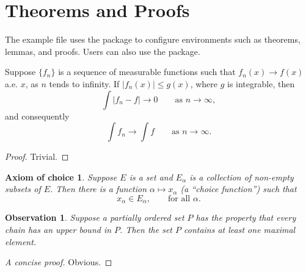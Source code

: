 \section{Theorems and Proofs}

The example file uses the  package to configure environments such as theorems, lemmas, and proofs.
Users can also use the  package.

\begin{theorem}
  Suppose $\{f_n\}$ is a sequence of measurable functions such that
  $f_n(x) \to f(x)$ a.e. $x$, as $n$ tends to infinity.
  If $|f_n(x)| \le g(x)$, where $g$ is integrable, then
  \begin{equation}
    \int |f_n - f| \to 0 \qquad \text{as } n \to \infty,
  \end{equation}
  and consequently
  \begin{equation}
    \int f_n \to \int f \qquad \text{as } n \to \infty.
  \end{equation}
\end{theorem}

\begin{proof}
  Trivial.
\end{proof}

\newtheorem*{axiomofchoice}{Axiom of choice}
\begin{axiomofchoice}
  Suppose $E$ is a set and ${E_\alpha}$ is a collection of
  non-empty subsets of $E$. Then there is a function $\alpha
  \mapsto x_\alpha$ (a ``choice function'') such that
  \begin{equation}
    x_\alpha \in E_\alpha,\qquad \text{for all }\alpha.
  \end{equation}
\end{axiomofchoice}

\newtheorem{observation}{Observation}
\begin{observation}
  Suppose a partially ordered set $P$ has the property
  that every chain has an upper bound in $P$. Then the
  set $P$ contains at least one maximal element.
\end{observation}
\begin{proof}[A concise proof]
  Obvious.
\end{proof}
